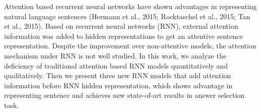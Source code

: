 Attention based recurrent neural networks have shown advantages in representing natural language sentences (Hermann et al., 2015; Rocktaschel et al., 2015; Tan et al., 2015). Based on recurrent neural networks (RNN), external attention information was added to hidden representations to get an attentive sentence representation. Despite the improvement over non-attentive models, the attention mechanism under RNN is not well studied. In this work, we analyze the deficiency of traditional attention based RNN models quantitatively and qualitatively. Then we present three new RNN models that add attention information before RNN hidden representation, which shows advantage in representing sentence and achieves new state-of-art results in answer selection task.
